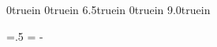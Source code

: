%
%
%
%
% 
%
\oddsidemargin   0truein
\evensidemargin  0truein
\textwidth 6.5truein
\topmargin 0truein
\headheight 0pt
\headsep 0pt
\textheight 9.0truein

\def\phone#1{\def\ph@ne{#1}}
\phone{(352) 644-3218}
\def\emailaddress{}
\def\email#1{\def\emailaddress{{\tensl\ email: \tentt #1}}}

\def\ps@firstpage{\def\@oddhead{}\def\@oddfoot{}%
\def\evenhead{}\def\evenfoot{}}

%
\longindentation=.5\textwidth
\indentedwidth=\textwidth
\advance\indentedwidth -\longindentation
%
%
%
\def\@texttop{}

